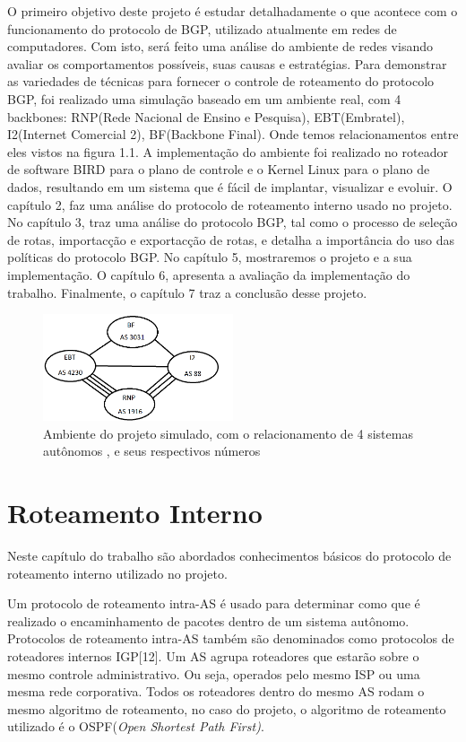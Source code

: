 \documentclass[12pt,a4paper]{report}
\begin{document}
O primeiro objetivo deste projeto \'e estudar detalhadamente o que acontece com o funcionamento do protocolo de BGP, utilizado atualmente em redes de computadores. Com isto, ser\'a feito uma an\'alise do ambiente de redes visando avaliar os comportamentos poss\'iveis, suas causas e estrat\'egias. Para demonstrar as variedades de t\'ecnicas para fornecer o controle de roteamento do protocolo BGP, foi realizado uma simula\c{c}\~ao baseado em um ambiente real, com 4 backbones: RNP(Rede Nacional de Ensino e Pesquisa), EBT(Embratel), I2(Internet Comercial 2), BF(Backbone Final). Onde temos relacionamentos entre eles vistos na figura 1.1. A implementa\c{c}\~ao do ambiente foi realizado no roteador de software BIRD para o plano de controle e o Kernel Linux para o plano de dados, resultando em um sistema que \'e f\'acil de implantar, visualizar e evoluir. O cap\'itulo 2, faz uma an\'alise do protocolo de roteamento interno usado no projeto. No cap\'itulo 3, traz uma an\'alise do protocolo BGP, tal como o processo de sele\c{c}\~ao de rotas, importac\c{c}\~ao e exportac\c{c}\~ao de rotas, e detalha a import\^ancia do uso das pol\'iticas do protocolo BGP. No cap\'itulo 5, mostraremos o projeto e a sua implementa\c{c}\~ao. O cap\'itulo 6, apresenta a avalia\c{c}\~ao da implementa\c{c}\~ao do trabalho. Finalmente, o cap\'itulo 7 traz a conclus\~ao desse projeto.

\begin{figure}[!htb]
 \centering
 \includegraphics[width=0.5\textwidth]{Imagens/Ambiente}
  \caption{\label{fig:Ambiente do projeto} Ambiente do projeto simulado, com o relacionamento de 4 sistemas aut\^onomos , e seus respectivos n\'umeros}
\end{figure}


\chapter{Roteamento Interno}

Neste cap\'itulo do trabalho s\~ao abordados conhecimentos b\'asicos do protocolo de roteamento interno utilizado no projeto.

Um protocolo de roteamento intra-AS \'e usado para determinar como que \'e realizado o encaminhamento de pacotes dentro de um sistema aut\^onomo. Protocolos de roteamento intra-AS tamb\'em s\~ao denominados como protocolos de roteadores internos IGP[12]. Um AS agrupa roteadores que estar\~ao sobre o mesmo controle administrativo. Ou seja, operados pelo mesmo ISP ou uma mesma rede corporativa. Todos os roteadores dentro do mesmo AS rodam o mesmo algoritmo de roteamento, no caso do projeto, o algoritmo de roteamento utilizado \'e o OSPF(\textit{Open Shortest Path First)}. 
\end{document}
